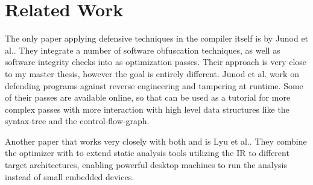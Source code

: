 \section{Related Work}
\label{sec:related-work}
The only paper applying defensive techniques in the compiler itself is by Junod et al.\cite{junod2015obfuscator}.
They integrate a number of software obfuscation techniques, as well as software integrity checks into \llvm{} as optimization passes.
Their approach is very close to my master thesis, however the goal is entirely different.
Junod et al. work on defending programs against reverse engineering and tampering at runtime.
Some of their passes are available online, so that can be used as a tutorial for more complex passes with more interaction with high level data structures like the syntax-tree and the control-flow-graph.

Another paper that works very closely with both \llvm{} and \qemu{} is Lyu et al.\cite{lyu2014dbill}.
They combine the \llvm{} optimizer with \qemu{} to extend static analysis tools utilizing the \llvm{} IR to different target architectures, enabling powerful desktop machines to run the analysis instead of small embedded devices.
